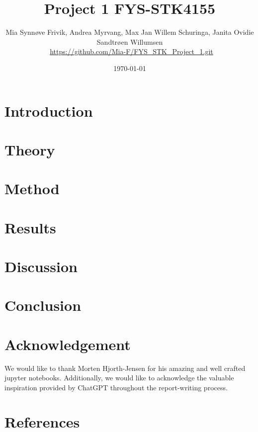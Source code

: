 \documentclass[reprint,english,notitlepage]{revtex4-1}  %
\begin{document}
\title{Project 1 FYS-STK4155}
\author{Mia Synnøve Frivik, Andrea Myrvang, Max Jan Willem Schuringa, Janita Ovidie Sandtrøen Willumsen \\ \faGithub \, \url{https://github.com/Mia-F/FYS_STK_Project_1.git}}        
\date{\today}
\noaffiliation  

\begin{abstract}

\end{abstract}

\maketitle 
%
\section{Introduction}

%
\section{Theory}

%
\section{Method}

%
\section{Results}

%
\section{Discussion}

%
\section{Conclusion}

\section{Acknowledgement}
\noindent We would like to thank Morten Hjorth-Jensen for his amazing and well crafted jupyter notebooks. Additionally, we would like to acknowledge the valuable 
inspiration provided by ChatGPT throughout the report-writing process. 
%
\clearpage
\newpage
\onecolumngrid
\appendix
{}

%
\newpage
\clearpage
%
\section*{References}  %

\end{document}
